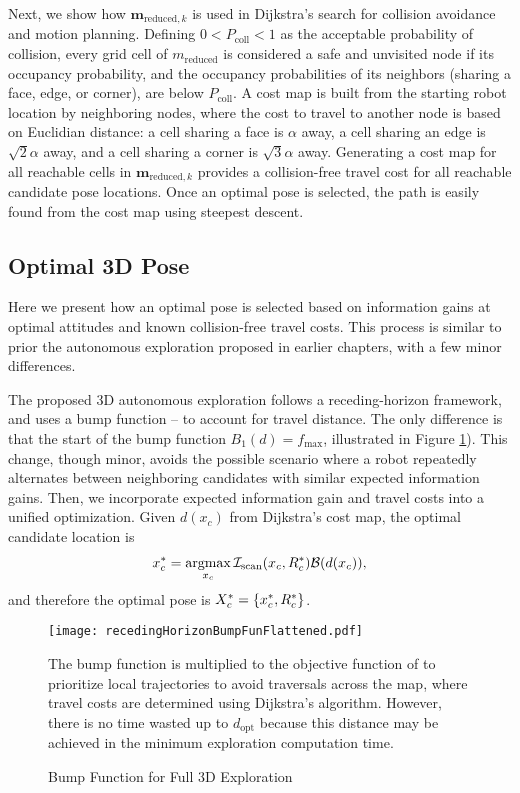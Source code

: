 Next, we show how $\mathbf{m}_{\text{reduced},k}$ is used in Dijkstra's search for collision avoidance and motion planning. Defining $0<P_\text{coll}<1$ as the acceptable probability of collision, every grid cell of $ m_\text{reduced}$ is considered a safe and unvisited node if its occupancy probability, and the occupancy probabilities of its neighbors (sharing a face, edge, or corner), are below $P_\text{coll}$. A cost map is built from the starting robot location by neighboring nodes, where the cost to travel to another node is based on Euclidian distance: a cell sharing a face is $\alpha$ away, a cell sharing an edge is $\sqrt2\alpha$ away, and a cell sharing a corner is $\sqrt3\alpha$ away. Generating a cost map for all reachable cells in $\mathbf{m}_{\text{reduced},k}$ provides a collision-free travel cost for all reachable candidate pose locations. Once an optimal pose is selected, the path is easily found from the cost map using steepest descent.


\subsection{Optimal 3D Pose}

Here we present how an optimal pose is selected based on information gains at optimal attitudes and known collision-free travel costs. This process is similar to prior the autonomous exploration proposed in earlier chapters, with a few minor differences.

The proposed 3D autonomous exploration follows a receding-horizon framework, and uses a bump function -- to account for travel distance. The only difference is that the start of the bump function $B_1(d)=f_\text{max}$, illustrated in Figure \ref{fig:recedingHorizonBumpFun}). This change, though minor, avoids the possible scenario where a robot repeatedly alternates between neighboring candidates with similar expected information gains.
Then, we incorporate expected information gain and travel costs into a unified optimization. Given $d(x_c)$ from Dijkstra's cost map, the optimal candidate location is
\begin{align}
\label{eqn:CandidateLocationOptimization}
x_c^*=\argmax_{x_c}\mathcal{I}_\text{scan}(x_c,R_c^*)\mathcal B(d(x_c)),
\end{align}
and therefore the optimal pose is $X_c^*=\left\{ x_c^*,R_c^* \right\}$.

\begin{figure}[!t]
	\centering
	\vspace*{-0.3\columnwidth}
		\centerline{
			\texttt{[image: recedingHorizonBumpFunFlattened.pdf]}
		}
	\vspace*{-0.25\columnwidth}
	\caption{Bump Function for Full 3D Exploration}
	\medskip
	\small
	The bump function is multiplied to the objective function of  to prioritize local trajectories to avoid traversals across the map, where travel costs are determined using Dijkstra's algorithm. However, there is no time wasted up to $d_\text{opt}$ because this distance may be achieved in the minimum exploration computation time.
	\label{fig:recedingHorizonBumpFun}
\end{figure}
	
